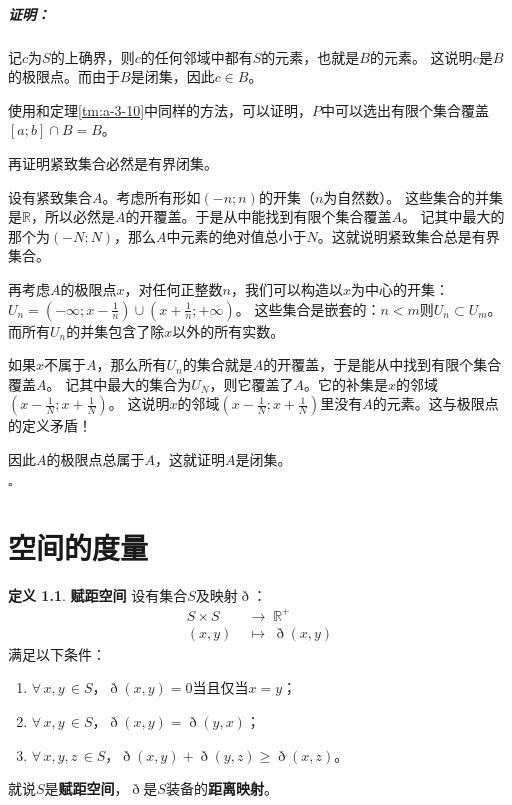 \documentclass[12pt,UTF8]{ctexbook}
\theoremstyle{definition}
\newtheorem{df}{定义}[section]
\theoremstyle{plain}
\renewenvironment{proof}{\paragraph{\textbf{证明：}}}{\hfill$\square$}
\begin{document}
\begin{appendix}
\begin{proof}
    记$c$为$S$的上确界，则$c$的任何邻域中都有$S$的元素，也就是$B$的元素。
    这说明$c$是$B$的极限点。而由于$B$是闭集，因此$c\in B$。

    使用和定理\ref{tm:a-3-10}中同样的方法，可以证明，$P$中可以选出有限个集合覆盖$[a;b]\cap B = B$。

    再证明紧致集合必然是有界闭集。

    设有紧致集合$A$。考虑所有形如$(-n;n)$的开集（$n$为自然数）。
    这些集合的并集是$\mathbb{R}$，所以必然是$A$的开覆盖。于是从中能找到有限个集合覆盖$A$。
    记其中最大的那个为$(-N;N)$，那么$A$中元素的绝对值总小于$N$。这就说明紧致集合总是有界集合。

    再考虑$A$的极限点$x$，对任何正整数$n$，我们可以构造以$x$为中心的开集：$\displaystyle U_n = \left(-\infty;x-\frac{1}{n}\right)\cup\left(x+\frac{1}{n};+\infty\right)$。
    这些集合是嵌套的：$n<m$则$U_n\subset U_m$。而所有$U_n$的并集包含了除$x$以外的所有实数。

    如果$x$不属于$A$，那么所有$U_n$的集合就是$A$的开覆盖，于是能从中找到有限个集合覆盖$A$。
    记其中最大的集合为$U_N$，则它覆盖了$A$。它的补集是$x$的邻域$\displaystyle\left(x-\frac{1}{N};x+\frac{1}{N}\right)$。
    这说明$x$的邻域$\displaystyle\left(x-\frac{1}{N};x+\frac{1}{N}\right)$里没有$A$的元素。这与极限点的定义矛盾！
    
    因此$A$的极限点总属于$A$，这就证明$A$是闭集。

\end{proof}

\chapter{空间的度量}

\begin{df}{\textbf{赋距空间}}
    设有集合$S$及映射$\eth$：
    \begin{align*}
        S\times S \;&\rightarrow \; \mathbb{R}^+ \\
        (x, y) \;&\mapsto \; \eth(x, y)
    \end{align*}
    满足以下条件：
    \begin{enumerate}
        \item $\forall \, x, y\, \in S$，$\eth(x, y) = 0$当且仅当$x = y$；
        \item $\forall \, x, y\, \in S$，$\eth(x, y) = \eth(y, x)$；
        \item $\forall \, x, y, z\, \in S$，$\eth(x, y) + \eth(y, z) \geqslant \eth (x, z)$。
    \end{enumerate}
    就说$S$是\textbf{赋距空间}，$\eth$是$S$装备的\textbf{距离映射}。
\end{df}


\end{appendix}
\end{document}
